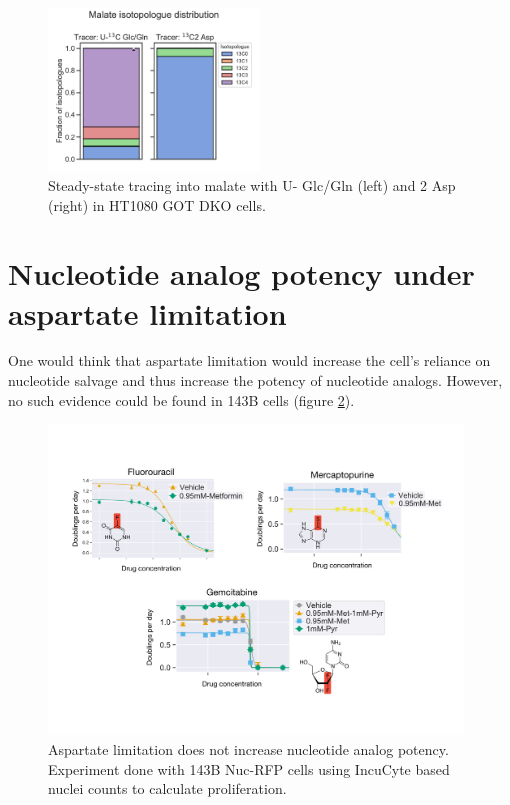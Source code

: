 \begin{figure}[ht]
    \centering
    \includegraphics[width=0.5\textwidth]{figures/sapp/DKO_char/HT1080_Mal_iso_dist.pdf}
    \caption[\hCi{} Gln/Glc, Asp tracing in HT1080 GOT DKO, Malate]{
    Steady-state tracing into malate with U-\hCi{} Glc/Gln (left) and \hCi{}2 Asp (right) in HT1080 GOT DKO cells.
    }
    \label{fig:sapp:DKO_char:HT1080_Mal_iso_dist}
\end{figure}




\FloatBarrier
\section{Nucleotide analog potency under aspartate limitation}
One would think that aspartate limitation would increase the cell's reliance on nucleotide salvage and thus increase the potency of nucleotide analogs.
However, no such evidence could be found in 143B cells (figure \ref{fig:sapp:random:nucleotide_analogs}).

\begin{figure}[ht]
    \centering
    \includegraphics[width=0.98\textwidth]{figures/sapp/random/nucleotide_analogs.pdf}
    \caption[Asp limitation does not increase nucleotide analog potency.]{
    Aspartate limitation does not increase nucleotide analog potency.
    Experiment done with 143B Nuc-RFP cells using IncuCyte based nuclei counts to calculate proliferation.
    }
    \label{fig:sapp:random:nucleotide_analogs}
\end{figure}









